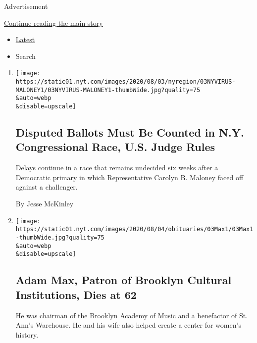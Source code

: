 Advertisement

\protect\hyperlink{after-mid1}{Continue reading the main story}

\begin{itemize}
\tightlist
\item
  \protect\hyperlink{stream-panel}{Latest}
\item
  Search
\end{itemize}

\begin{enumerate}
\def\labelenumi{\arabic{enumi}.}
\item
  \href{/2020/08/03/nyregion/nyc-congress-carolyn-mahoney-ballots.html}{}

  \texttt{[image: https://static01.nyt.com/images/2020/08/03/nyregion/03NYVIRUS-MALONEY1/03NYVIRUS-MALONEY1-thumbWide.jpg?quality=75\\\&auto=webp\\\&disable=upscale]}

  \hypertarget{disputed-ballots-must-be-counted-in-ny-congressional-race-us-judge-rules}{%
  \subsection{Disputed Ballots Must Be Counted in N.Y. Congressional
  Race, U.S. Judge
  Rules}\label{disputed-ballots-must-be-counted-in-ny-congressional-race-us-judge-rules}}

  Delays continue in a race that remains undecided six weeks after a
  Democratic primary in which Representative Carolyn B. Maloney faced
  off against a challenger.

  By Jesse McKinley
\item
  \href{/2020/08/03/arts/adam-max-patron-of-brooklyn-cultural-institutions-dies-at-62.html}{}

  \texttt{[image: https://static01.nyt.com/images/2020/08/04/obituaries/03Max1/03Max1-thumbWide.jpg?quality=75\\\&auto=webp\\\&disable=upscale]}

  \hypertarget{adam-max-patron-of-brooklyn-cultural-institutions-dies-at-62}{%
  \subsection{Adam Max, Patron of Brooklyn Cultural Institutions, Dies
  at
  62}\label{adam-max-patron-of-brooklyn-cultural-institutions-dies-at-62}}

  He was chairman of the Brooklyn Academy of Music and a benefactor of
  St. Ann's Warehouse. He and his wife also helped create a center for
  women's history.


\end{enumerate}
